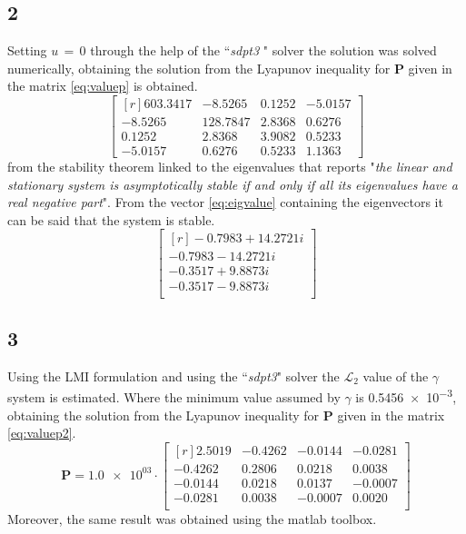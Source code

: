 \subsection{2}
Setting \(u\,=\,0\) through the help of the ``\emph{sdpt3} " solver the solution
was solved numerically, obtaining the solution from the Lyapunov inequality for
 \(\mathbf{P}\) given in the matrix \eqref{eq:valuep} is obtained.
 \begin{equation}
 	\label{eq:valuep}
 	\begin{bmatrix*}[r]
 		603.3417	&   -8.5265	&    0.1252	&   -5.0157\\
		-8.5265	&  128.7847	&    2.8368	&    0.6276\\
		0.1252	&    2.8368	&    3.9082	&    0.5233\\
		-5.0157	&    0.6276	&    0.5233	&    1.1363
	\end{bmatrix*}
\end{equation}
from the stability theorem linked to the eigenvalues that reports "\emph{the 
linear and stationary system is asymptotically stable if and only if all its 
eigenvalues have a real negative part}".\cite{bolzern2015fondamenti} 
From the vector \eqref{eq:eigvalue} containing the eigenvectors it can be said 
that the system is stable.
\begin{equation}
	\label{eq:eigvalue}
	\begin{bmatrix*}[r]
		-0.7983 +14.2721i\\
  		-0.7983 -14.2721i\\
  		-0.3517 + 9.8873i\\
  		-0.3517 - 9.8873i\\
	\end{bmatrix*}
\end{equation}

\subsection{3}
Using the LMI formulation\cite{notelmi} and using the ``\emph{sdpt3}" solver the
 \(\mathcal{L}_{2}\) value of the \(\gamma\) system is estimated.
Where the minimum value assumed by \(\gamma\) is \num{0.5456e-3}, obtaining the
solution from the Lyapunov inequality for
 \(\mathbf{P}\) given in the matrix \eqref{eq:valuep2}.
\begin{equation}
\label{eq:valuep2}
	\mathbf{P} = \num{1.0e+03}\cdot
	\begin{bmatrix*}[r]
    		2.5019  	& 	-0.4262   	&	-0.0144 	 & 	-0.0281\\
   		-0.4262  	& 	 0.2806   	& 	0.0218   	& 		0.0038\\
   		-0.0144   	& 	0.0218  	&  0.0137   	&		-0.0007\\
   		-0.0281    	&	0.0038 	&  -0.0007   	&	 	0.0020\\
   	\end{bmatrix*}
\end{equation}
Moreover, the same result was obtained using the matlab toolbox.
